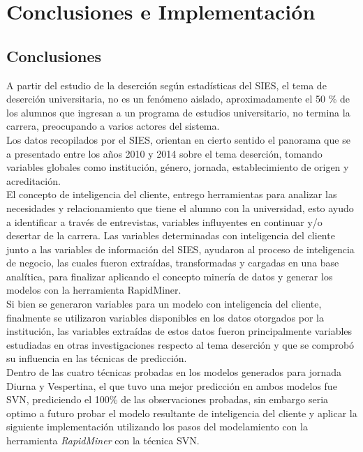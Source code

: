 \chapter[Conclusiones e Implementación]{Conclusiones e Implementación}
\label{ch:conclu}

\section{Conclusiones}
A partir del estudio de la deserción según estadísticas del SIES, el tema de deserción universitaria, no es un fenómeno aislado, aproximadamente el 50 \%  de los alumnos que ingresan a un programa de estudios universitario, no termina la carrera, preocupando a varios actores del sistema.\\

Los datos recopilados por el SIES, orientan en cierto sentido el panorama que se a presentado entre los años 2010 y 2014 sobre el tema deserción, tomando variables globales como institución, género, jornada, establecimiento de origen y acreditación.\\

El concepto de inteligencia del cliente, entrego herramientas para analizar las necesidades y relacionamiento que tiene el alumno con la universidad, esto ayudo a identificar a través de entrevistas, variables influyentes en continuar y/o desertar de la carrera. Las variables determinadas con inteligencia del cliente junto a las variables de información del SIES, ayudaron al proceso de inteligencia de negocio, las cuales fueron extraídas, transformadas y cargadas en una base analítica, para finalizar aplicando el concepto minería de datos y generar los modelos con la herramienta RapidMiner.\\

Si bien se generaron variables para un modelo con inteligencia del cliente, finalmente se utilizaron variables disponibles en los datos otorgados por la institución, las variables extraídas de estos datos fueron principalmente variables estudiadas en otras investigaciones respecto al tema deserción y que se comprobó su influencia en las técnicas de predicción.\\

Dentro de las cuatro técnicas probadas en los modelos generados para jornada Diurna y Vespertina, el que tuvo una mejor predicción en ambos modelos fue SVN, prediciendo el 100\% de las observaciones probadas, sin embargo seria optimo a futuro probar el modelo resultante de inteligencia del cliente y aplicar la siguiente implementación utilizando los pasos del modelamiento con la herramienta \textit{RapidMiner} con la técnica SVN.\\

